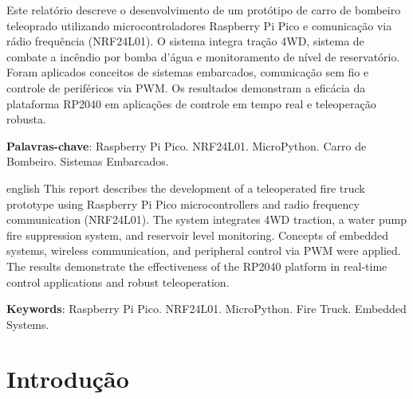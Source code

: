 \documentclass[
	12pt,				
	openright,			
	oneside,			
	a4paper,			
	english,			
	brazilian			
	]{abntex2}
\begin{document}
\frenchspacing 

\imprimircapa
\imprimirfolhaderosto

\begin{resumo}
 Este relatório descreve o desenvolvimento de um protótipo de carro de bombeiro teleoprado utilizando microcontroladores Raspberry Pi Pico e comunicação via rádio frequência (NRF24L01). O sistema integra tração 4WD, sistema de combate a incêndio por bomba d'água e monitoramento de nível de reservatório. Foram aplicados conceitos de sistemas embarcados, comunicação sem fio e controle de periféricos via PWM. Os resultados demonstram a eficácia da plataforma RP2040 em aplicações de controle em tempo real e teleoperação robusta.

 \vspace{\onelineskip}
    
 \noindent
 \textbf{Palavras-chave}: Raspberry Pi Pico. NRF24L01. MicroPython. Carro de Bombeiro. Sistemas Embarcados.
\end{resumo}

\begin{resumo}[Abstract]
 \begin{otherlanguage*}{english}
   This report describes the development of a teleoperated fire truck prototype using Raspberry Pi Pico microcontrollers and radio frequency communication (NRF24L01). The system integrates 4WD traction, a water pump fire suppression system, and reservoir level monitoring. Concepts of embedded systems, wireless communication, and peripheral control via PWM were applied. The results demonstrate the effectiveness of the RP2040 platform in real-time control applications and robust teleoperation.

   \vspace{\onelineskip}
 
   \noindent
   \textbf{Keywords}: Raspberry Pi Pico. NRF24L01. MicroPython. Fire Truck. Embedded Systems.
 \end{otherlanguage*}
\end{resumo}

\tableofcontents*
\cleardoublepage

\textual

\chapter{Introdução}
\end{document}
